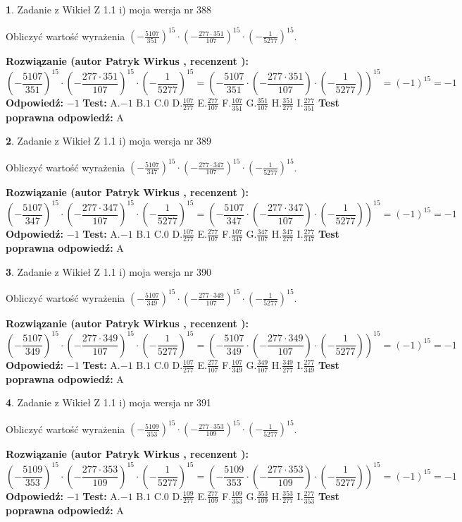 \documentclass[12pt, a4paper]{article}
\theoremstyle{definition} %
\newtheorem{zad}{}
\newcommand{\zadStart}[1]{\begin{zad}#1\newline}
\newcommand{\zadStop}{\end{zad}}
\newcommand{\rozwStart}[2]{\noindent \textbf{Rozwiązanie (autor #1 , recenzent #2): }\newline}
\newcommand{\rozwStop}{\newline}
\newcommand{\odpStart}{\noindent \textbf{Odpowiedź:}\newline}
\newcommand{\odpStop}{\newline}
\newcommand{\testStart}{\noindent \textbf{Test:}\newline}
\newcommand{\testStop}{\newline}
\newcommand{\kluczStart}{\noindent \textbf{Test poprawna odpowiedź:}\newline}
\newcommand{\kluczStop}{\newline}
\begin{document}
\zadStart{Zadanie z Wikieł Z 1.1 i) moja wersja nr 388}

Obliczyć wartość wyrażenia $(-\frac{5107}{351})^{15} \cdot (-\frac{277 \cdot 351}{107})^{15} \cdot (-\frac{1}{5277})^{15}$.
\zadStop
\rozwStart{Patryk Wirkus}{}
$$(-\frac{5107}{351})^{15} \cdot (-\frac{277 \cdot 351}{107})^{15} \cdot (-\frac{1}{5277})^{15} = (-\frac{5107}{351} \cdot (-\frac{277 \cdot 351}{107}) \cdot (-\frac{1}{5277}))^{15} = (-1)^{15} = -1$$
\rozwStop
\odpStart
$-1$
\odpStop
\testStart
A.$-1$ B.$1$ C.$0$ D.$\frac{107}{277}$ E.$\frac{277}{107}$
F.$\frac{107}{351}$ G.$\frac{351}{107}$
H.$\frac{351}{277}$
I.$\frac{277}{351}$
\testStop
\kluczStart
A
\kluczStop



\zadStart{Zadanie z Wikieł Z 1.1 i) moja wersja nr 389}

Obliczyć wartość wyrażenia $(-\frac{5107}{347})^{15} \cdot (-\frac{277 \cdot 347}{107})^{15} \cdot (-\frac{1}{5277})^{15}$.
\zadStop
\rozwStart{Patryk Wirkus}{}
$$(-\frac{5107}{347})^{15} \cdot (-\frac{277 \cdot 347}{107})^{15} \cdot (-\frac{1}{5277})^{15} = (-\frac{5107}{347} \cdot (-\frac{277 \cdot 347}{107}) \cdot (-\frac{1}{5277}))^{15} = (-1)^{15} = -1$$
\rozwStop
\odpStart
$-1$
\odpStop
\testStart
A.$-1$ B.$1$ C.$0$ D.$\frac{107}{277}$ E.$\frac{277}{107}$
F.$\frac{107}{347}$ G.$\frac{347}{107}$
H.$\frac{347}{277}$
I.$\frac{277}{347}$
\testStop
\kluczStart
A
\kluczStop



\zadStart{Zadanie z Wikieł Z 1.1 i) moja wersja nr 390}

Obliczyć wartość wyrażenia $(-\frac{5107}{349})^{15} \cdot (-\frac{277 \cdot 349}{107})^{15} \cdot (-\frac{1}{5277})^{15}$.
\zadStop
\rozwStart{Patryk Wirkus}{}
$$(-\frac{5107}{349})^{15} \cdot (-\frac{277 \cdot 349}{107})^{15} \cdot (-\frac{1}{5277})^{15} = (-\frac{5107}{349} \cdot (-\frac{277 \cdot 349}{107}) \cdot (-\frac{1}{5277}))^{15} = (-1)^{15} = -1$$
\rozwStop
\odpStart
$-1$
\odpStop
\testStart
A.$-1$ B.$1$ C.$0$ D.$\frac{107}{277}$ E.$\frac{277}{107}$
F.$\frac{107}{349}$ G.$\frac{349}{107}$
H.$\frac{349}{277}$
I.$\frac{277}{349}$
\testStop
\kluczStart
A
\kluczStop



\zadStart{Zadanie z Wikieł Z 1.1 i) moja wersja nr 391}

Obliczyć wartość wyrażenia $(-\frac{5109}{353})^{15} \cdot (-\frac{277 \cdot 353}{109})^{15} \cdot (-\frac{1}{5277})^{15}$.
\zadStop
\rozwStart{Patryk Wirkus}{}
$$(-\frac{5109}{353})^{15} \cdot (-\frac{277 \cdot 353}{109})^{15} \cdot (-\frac{1}{5277})^{15} = (-\frac{5109}{353} \cdot (-\frac{277 \cdot 353}{109}) \cdot (-\frac{1}{5277}))^{15} = (-1)^{15} = -1$$
\rozwStop
\odpStart
$-1$
\odpStop
\testStart
A.$-1$ B.$1$ C.$0$ D.$\frac{109}{277}$ E.$\frac{277}{109}$
F.$\frac{109}{353}$ G.$\frac{353}{109}$
H.$\frac{353}{277}$
I.$\frac{277}{353}$
\testStop
\kluczStart
A
\kluczStop
\end{document}
